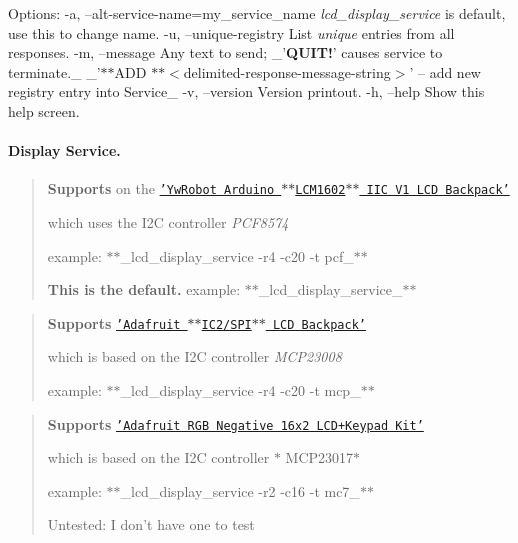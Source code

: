 Options\+: -\/a, --alt-\/service-\/name=my\+\_\+service\+\_\+name {\itshape lcd\+\_\+display\+\_\+service} is default, use this to change name. -\/u, --unique-\/registry List {\itshape unique} entries from all responses. -\/m, --message Any text to send; \+\_\+'{\bfseries Q\+U\+I\+T!}' causes service to terminate.\+\_\+ \+\_\+'$\ast$$\ast$\+A\+D\+D $\ast$$\ast$$<$delimited-\/response-\/message-\/string$>$' -- add new registry entry into Service\+\_\+ -\/v, --version Version printout. -\/h, --help Show this help screen.

\paragraph*{Display Service.}



\begin{quote}
{\bfseries Supports} on the \href{http://arduino-info.wikispaces.com/LCD-Blue-I2C}{\tt 'Yw\+Robot Arduino $\ast$$\ast$\+L\+C\+M1602$\ast$$\ast$ I\+I\+C V1 L\+C\+D Backpack'}
\begin{DoxyItemize}
\item which uses the I2\+C controller {\itshape P\+C\+F8574}
\item example\+: $\ast$$\ast$\+\_\+lcd\+\_\+display\+\_\+service -\/r4 -\/c20 -\/t pcf\+\_\+$\ast$$\ast$
\item {\bfseries This is the default.} example\+: $\ast$$\ast$\+\_\+lcd\+\_\+display\+\_\+service\+\_\+$\ast$$\ast$ 
\end{DoxyItemize}\end{quote}


\begin{quote}
{\bfseries Supports} \href{https://www.adafruit.com/products/292}{\tt 'Adafruit $\ast$$\ast$\+I\+C2/\+S\+P\+I$\ast$$\ast$ L\+C\+D Backpack'}
\begin{DoxyItemize}
\item which is based on the I2\+C controller {\itshape M\+C\+P23008}
\item example\+: $\ast$$\ast$\+\_\+lcd\+\_\+display\+\_\+service -\/r4 -\/c20 -\/t mcp\+\_\+$\ast$$\ast$ 
\end{DoxyItemize}\end{quote}


\begin{quote}
{\bfseries Supports} \href{https://www.adafruit.com/products/1110}{\tt 'Adafruit R\+G\+B Negative 16x2 L\+C\+D+\+Keypad Kit'}
\begin{DoxyItemize}
\item which is based on the I2\+C controller $\ast$ M\+C\+P23017$\ast$
\item example\+: $\ast$$\ast$\+\_\+lcd\+\_\+display\+\_\+service -\/r2 -\/c16 -\/t mc7\+\_\+$\ast$$\ast$
\item Untested\+: I don't have one to test 
\end{DoxyItemize}\end{quote}


